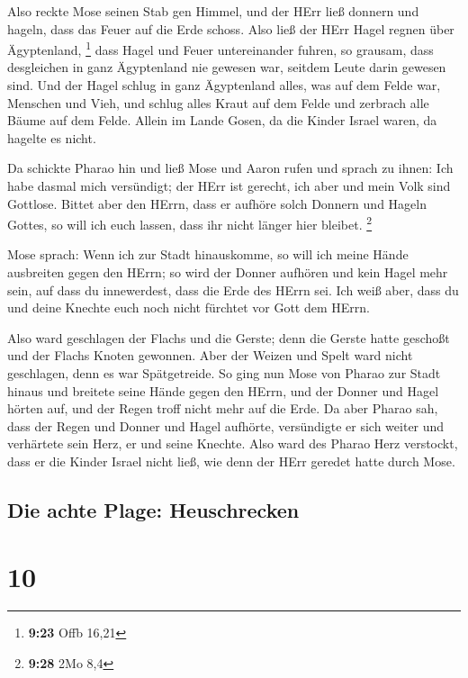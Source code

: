 Also reckte Mose seinen Stab gen Himmel, und der HErr
ließ donnern und hageln, dass das Feuer auf die Erde schoss. Also ließ
der HErr Hagel regnen über Ägyptenland, \footnote{\textbf{9:23} Offb
  16,21}  dass Hagel und Feuer untereinander fuhren, so
grausam, dass desgleichen in ganz Ägyptenland nie gewesen war, seitdem
Leute darin gewesen sind.  Und der Hagel schlug in ganz
Ägyptenland alles, was auf dem Felde war, Menschen und Vieh, und schlug
alles Kraut auf dem Felde und zerbrach alle Bäume auf dem Felde.
 Allein im Lande Gosen, da die Kinder Israel waren, da
hagelte es nicht.

 Da schickte Pharao hin und ließ Mose und Aaron rufen und
sprach zu ihnen: Ich habe dasmal mich versündigt; der HErr ist gerecht,
ich aber und mein Volk sind Gottlose.  Bittet aber den
HErrn, dass er aufhöre solch Donnern und Hageln Gottes, so will ich euch
lassen, dass ihr nicht länger hier bleibet. \footnote{\textbf{9:28} 2Mo
  8,4}

 Mose sprach: Wenn ich zur Stadt hinauskomme, so will ich
meine Hände ausbreiten gegen den HErrn; so wird der Donner aufhören und
kein Hagel mehr sein, auf dass du innewerdest, dass die Erde des HErrn
sei.  Ich weiß aber, dass du und deine Knechte euch noch
nicht fürchtet vor Gott dem HErrn.

 Also ward geschlagen der Flachs und die Gerste; denn die
Gerste hatte geschoßt und der Flachs Knoten gewonnen. 
Aber der Weizen und Spelt ward nicht geschlagen, denn es war
Spätgetreide.  So ging nun Mose von Pharao zur Stadt
hinaus und breitete seine Hände gegen den HErrn, und der Donner und
Hagel hörten auf, und der Regen troff nicht mehr auf die Erde.
 Da aber Pharao sah, dass der Regen und Donner und Hagel
aufhörte, versündigte er sich weiter und verhärtete sein Herz, er und
seine Knechte.  Also ward des Pharao Herz verstockt, dass
er die Kinder Israel nicht ließ, wie denn der HErr geredet hatte durch
Mose.

\hypertarget{die-achte-plage-heuschrecken}{%
\subsection{Die achte Plage:
Heuschrecken}\label{die-achte-plage-heuschrecken}}

\hypertarget{section-9}{%
\section{10}\label{section-9}}

